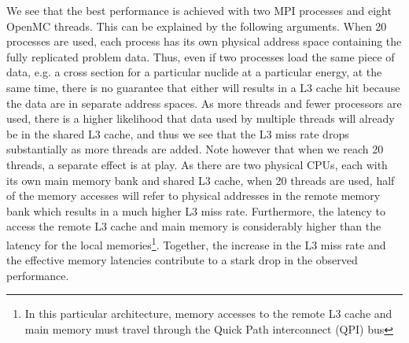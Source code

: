 \documentclass{mc2015}
\begin{document}
We see that the best performance is achieved with two MPI processes and eight
OpenMC threads. This can be explained by the following arguments. When 20
processes are used, each process has its own physical address space containing
the fully replicated problem data. Thus, even if two processes load the same
piece of data, e.g. a cross section for a particular nuclide at a particular
energy, at the same time, there is no guarantee that either will results in a L3
cache hit because the data are in separate address spaces. As more threads and
fewer processors are used, there is a higher likelihood that data used by
multiple threads will already be in the shared L3 cache, and thus we see that
the L3 miss rate drops substantially as more threads are added. Note however
that when we reach 20 threads, a separate effect is at play. As there are two
physical CPUs, each with its own main memory bank and shared L3 cache, when 20
threads are used, half of the memory accesses will refer to physical addresses
in the remote memory bank which results in a much higher L3 miss
rate. Furthermore, the latency to access the remote L3 cache and main memory is
considerably higher than the latency for the local memories\footnote{In this
  particular architecture, memory accesses to the remote L3 cache and main
  memory must travel through the Quick Path interconnect (QPI) bus}. Together,
the increase in the L3 miss rate and the effective memory latencies contribute
to a stark drop in the observed performance.
\end{document}
